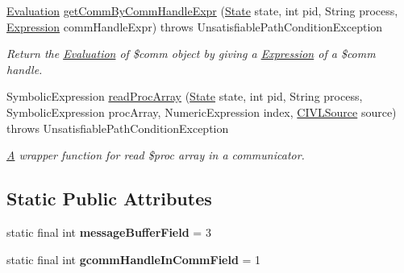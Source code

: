 \begin{DoxyCompactItemize}
\hyperlink{classedu_1_1udel_1_1cis_1_1vsl_1_1civl_1_1semantics_1_1IF_1_1Evaluation}{Evaluation} \hyperlink{classedu_1_1udel_1_1cis_1_1vsl_1_1civl_1_1library_1_1comm_1_1LibcommEvaluator_a2c0b2b39791ec6ee3fcfcdde88ef65be}{get\+Comm\+By\+Comm\+Handle\+Expr} (\hyperlink{interfaceedu_1_1udel_1_1cis_1_1vsl_1_1civl_1_1state_1_1IF_1_1State}{State} state, int pid, String process, \hyperlink{interfaceedu_1_1udel_1_1cis_1_1vsl_1_1civl_1_1model_1_1IF_1_1expression_1_1Expression}{Expression} comm\+Handle\+Expr)  throws Unsatisfiable\+Path\+Condition\+Exception 
\begin{DoxyCompactList}\small\item\em Return the \hyperlink{}{Evaluation} of \$comm object by giving a \hyperlink{}{Expression} of a \$comm handle. \end{DoxyCompactList}\item 
Symbolic\+Expression \hyperlink{classedu_1_1udel_1_1cis_1_1vsl_1_1civl_1_1library_1_1comm_1_1LibcommEvaluator_a677363074014ed914c9a1f7f2d252009}{read\+Proc\+Array} (\hyperlink{interfaceedu_1_1udel_1_1cis_1_1vsl_1_1civl_1_1state_1_1IF_1_1State}{State} state, int pid, String process, Symbolic\+Expression proc\+Array, Numeric\+Expression index, \hyperlink{interfaceedu_1_1udel_1_1cis_1_1vsl_1_1civl_1_1model_1_1IF_1_1CIVLSource}{C\+I\+V\+L\+Source} source)  throws Unsatisfiable\+Path\+Condition\+Exception 
\begin{DoxyCompactList}\small\item\em \hyperlink{structA}{A} wrapper function for read \$proc array in a communicator. \end{DoxyCompactList}\end{DoxyCompactItemize}
\subsection*{Static Public Attributes}
\begin{DoxyCompactItemize}
\item 
\hypertarget{classedu_1_1udel_1_1cis_1_1vsl_1_1civl_1_1library_1_1comm_1_1LibcommEvaluator_a131a646654bd0da3b6a6f9fcda6aeb0a}{}static final int {\bfseries message\+Buffer\+Field} = 3\label{classedu_1_1udel_1_1cis_1_1vsl_1_1civl_1_1library_1_1comm_1_1LibcommEvaluator_a131a646654bd0da3b6a6f9fcda6aeb0a}

\item 
\hypertarget{classedu_1_1udel_1_1cis_1_1vsl_1_1civl_1_1library_1_1comm_1_1LibcommEvaluator_a0e5e9986791c5e0a0605659449d69277}{}static final int {\bfseries gcomm\+Handle\+In\+Comm\+Field} = 1\label{classedu_1_1udel_1_1cis_1_1vsl_1_1civl_1_1library_1_1comm_1_1LibcommEvaluator_a0e5e9986791c5e0a0605659449d69277}

\end{DoxyCompactItemize}
